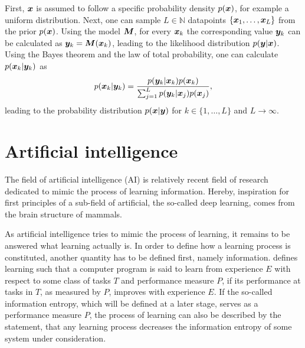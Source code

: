 \documentclass[a4paper,12pt]{report}
\begin{document}
First, $\bm{x}$ is assumed to follow a specific probability density $p(\bm{x})$, for example a uniform distribution. Next, one can sample $L\in \mathbb{N}$ datapoints $\{\bm{x}_{1},\dots,\bm{x}_{L}\}$ from the prior $p(\bm{x})$. Using the model $\bm{M}$, for every $\bm{x}_{k}$ the corresponding value $\bm{y}_{k}$ can be calculated as $\bm{y}_{k} = \bm{M}(\bm{x}_{k})$, leading to the likelihood distribution $p(\bm{y}|\bm{x})$. Using the Bayes theorem and the law of total probability, one can calculate $p(\bm{x}_{k}|\bm{y}_{k})$ as \begin{equation}
p(\bm{x}_{k}|\bm{y}_{k}) = \frac{p(\bm{y}_{k}|\bm{x}_{k})p(\bm{x}_{k})}{\sum_{j=1}^{L}p(\bm{y}_{k}|\bm{x}_{j})p(\bm{x}_{j})},
\end{equation} leading to the probability distribution $p(\bm{x}|\bm{y})$ for $k \in \{1,\dots,L\}$ and $L \rightarrow \infty$.

\chapter{Artificial intelligence}
The field of artificial intelligence (AI) is relatively recent field of research dedicated to mimic the process of learning information. Hereby, inspiration for first principles of a sub-field of artificial, the so-called deep learning, comes from the brain structure of mammals. 

As artificial intelligence tries to mimic the process of learning, it remains to be answered what learning actually is. In order to define how a learning process is constituted, another quantity has to be defined first, namely information. \cite[p.2]{Mitchell.1997} defines learning such that a computer program is said to learn from experience $E$ with respect to some class of tasks $T$ and performance measure $P$, if its performance at tasks in $T$, as measured by $P$, improves with experience $E$. If the so-called information entropy, which will be defined at a later stage, serves as a performance measure $P$, the process of learning can also be described by the statement, that any learning process decreases the information entropy of some system under consideration.
\end{document}
